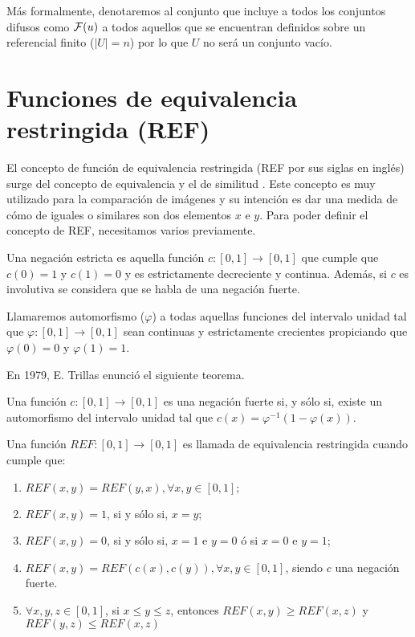 

Más formalmente, denotaremos al conjunto que incluye a todos los conjuntos difusos como $\mathcal{F}(u)$ a todos aquellos que se encuentran definidos sobre un referencial finito ($|U| = n$) por lo que $U$ no será un conjunto vacío.
 


\section{Funciones de equivalencia restringida (REF)}\label{sec:ref}
El concepto de función de equivalencia restringida (REF por sus siglas en inglés) surge del concepto de equivalencia y el de similitud \cite{art:refbarrenechea}. Este concepto es muy utilizado para la comparación de imágenes y su intención es dar una medida de cómo de iguales o similares son dos elementos $x$ e $y$. Para poder definir el concepto de REF, necesitamos varios previamente. 

\begin{definition}\label{def:negacionestricta}
Una negación estricta es aquella función $c : [0, 1] \rightarrow [0, 1]$ que cumple que $c(0)=1$ y $c(1)=0$ y es estrictamente decreciente y continua. Además, si $c$ es involutiva se considera que se habla de una negación fuerte.
\end{definition}

\begin{definition}\label{def:automorfismo}
Llamaremos automorfismo ($\varphi$) a todas aquellas funciones del intervalo unidad tal que $\varphi : [0, 1] \rightarrow [0, 1]$ sean continuas y estrictamente crecientes propiciando que $\varphi(0)=0$ y $\varphi(1)=1$.
\end{definition}

En 1979, E. Trillas \cite{art:thtrillas} enunció el siguiente teorema. 
\begin{theorem}\label{th:trillas}
Una función $c : [0, 1] \rightarrow [0, 1]$ es una negación fuerte si, y sólo si, existe un automorfismo del intervalo unidad tal que $c(x)=\varphi^{-1}(1-\varphi(x))$.
\end{theorem}

\begin{definition}\label{def:ref}
Una función $REF  : [0, 1] \rightarrow [0, 1]$ es llamada de equivalencia restringida cuando cumple que:
	\begin{enumerate}
	\item $REF(x, y) = REF(y, x), \forall x, y \in [0, 1];$
	\item $REF(x, y) = 1$, si y sólo si, $x=y$;
	\item $REF(x, y) = 0$, si y sólo si, $x=1$ e $y=0$ ó si $x=0$ e $y=1$;
	\item $REF(x, y) = REF(c(x), c(y)),  \forall x, y \in [0, 1]$, siendo $c$ una negación fuerte.
	\item $\forall x, y, z \in [0, 1]$, si $x\leq y\leq z$, entonces $REF(x, y)\geq REF(x, z)$ y  $REF(y, z)\leq REF(x, z)$
	\end{enumerate}
\end{definition}

